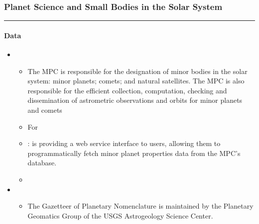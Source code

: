 \documentclass[letterpaper,10pt,english]{sphinxmanual}
\begin{document}
\subsubsection{Planet Science and Small Bodies in the Solar System}
\label{\detokenize{resource/astro/topics/solar_system:planet-science-and-small-bodies-in-the-solar-system}}\label{\detokenize{resource/astro/topics/solar_system::doc}}


\bigskip\hrule\bigskip



\paragraph{Data}
\label{\detokenize{resource/astro/topics/solar_system:data}}\begin{itemize}
\item {} 
\begin{itemize}
\item {} 
The MPC is responsible for the designation of minor bodies in the
solar system: minor planets; comets; and natural satellites. The
MPC is also responsible for the efficient collection, computation,
checking and dissemination of astrometric observations and orbits
for minor planets and comets

\item {} 
For 

\item {} 
:
is providing a web service interface to users, allowing them to
programmatically fetch minor planet properties data from the MPC’s
database.

\item {} 

\end{itemize}

\item {} 
\begin{itemize}
\item {} 
The Gazetteer of Planetary Nomenclature is maintained by the
Planetary Geomatics Group of the USGS Astrogeology Science Center.

\end{itemize}

\end{itemize}
\end{document}
